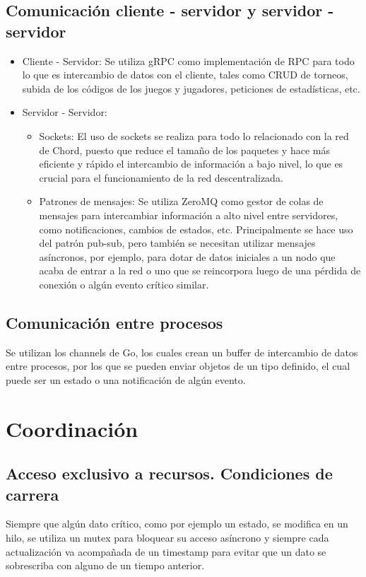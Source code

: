 \documentclass{article}
\begin{document}
\subsection{Comunicación cliente - servidor y servidor - servidor}
\begin{itemize}
\item{Cliente - Servidor:} Se utiliza gRPC como implementación de RPC para todo lo que es intercambio de datos con el cliente, tales como CRUD de torneos, subida de los códigos de los juegos y jugadores, peticiones de estadísticas, etc.
\item{Servidor - Servidor:}
\begin{itemize}
\item{Sockets:} El uso de sockets se realiza para todo lo relacionado con la red de Chord, puesto que reduce el tamaño de los paquetes y hace más eficiente y rápido el intercambio de información a bajo nivel, lo que es crucial para el funcionamiento de la red descentralizada.
\item{Patrones de mensajes:} Se utiliza ZeroMQ como gestor de colas de mensajes para intercambiar información a alto nivel entre servidores, como notificaciones, cambios de estados, etc. Principalmente se hace uso del patrón pub-sub, pero también se necesitan utilizar mensajes asíncronos, por ejemplo, para dotar de datos iniciales a un nodo que acaba de entrar a la red o uno que se reincorpora luego de una pérdida de conexión o algún evento crítico similar.
\end{itemize}
\end{itemize}

\subsection{Comunicación entre procesos}
Se utilizan los channels de Go, los cuales crean un buffer de intercambio de datos entre procesos, por los que se pueden enviar objetos de un tipo definido, el cual puede ser un estado o una notificación de algún evento.

\section{Coordinación}
\subsection{Acceso exclusivo a recursos. Condiciones de carrera}
Siempre que algún dato crítico, como por ejemplo un estado, se modifica en un hilo, se utiliza un mutex para bloquear su acceso asíncrono y siempre cada actualización va acompañada de un timestamp para evitar que un dato se sobrescriba con alguno de un tiempo anterior.
\end{document}

